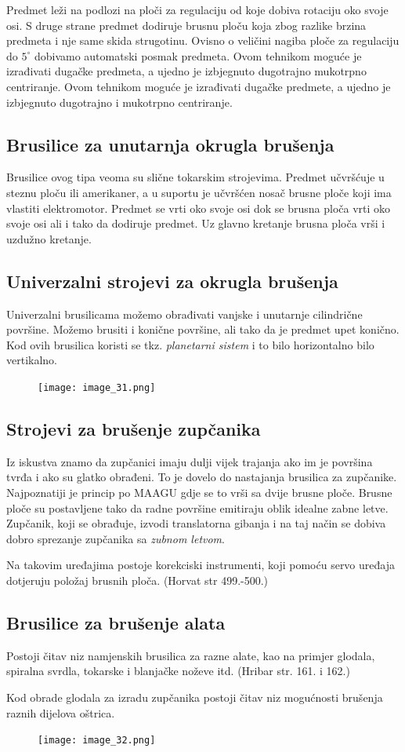 \documentclass[a4paper,12pt]{article}
\numberwithin{figure}{section}
\begin{document}
\FloatBarrier
Predmet leži na podlozi na ploči za regulaciju od koje dobiva rotaciju oko svoje osi. S druge strane predmet dodiruje brusnu ploču koja zbog razlike brzina predmeta i nje same skida strugotinu. Ovisno o veličini nagiba ploče za regulaciju do $5^{\circ}$ dobivamo automatski posmak predmeta. Ovom tehnikom moguće je izrađivati dugačke predmeta, a ujedno je izbjegnuto dugotrajno mukotrpno centriranje. Ovom tehnikom moguće je izrađivati dugačke predmete, a ujedno je izbjegnuto dugotrajno i mukotrpno centriranje. 
\subsection{Brusilice za unutarnja okrugla brušenja}
Brusilice ovog tipa veoma su slične tokarskim strojevima. Predmet učvršćuje u steznu ploču ili amerikaner, a u suportu je učvršćen nosač brusne ploče koji ima vlastiti elektromotor. Predmet se vrti oko svoje osi dok se brusna ploča vrti oko svoje osi ali i tako da dodiruje predmet. Uz glavno kretanje brusna ploča vrši i uzdužno kretanje.
\subsection{Univerzalni strojevi za okrugla brušenja}
Univerzalni brusilicama možemo obrađivati vanjske i unutarnje cilindrične površine. Možemo brusiti i konične površine, ali tako da je predmet upet konično. Kod ovih brusilica koristi se tkz. \textit{planetarni sistem} i to bilo horizontalno bilo vertikalno.
\begin{figure}[!h]
\centering
\texttt{[image: image\_31.png]}
\end{figure}
\FloatBarrier
\subsection{Strojevi za brušenje zupčanika}
Iz iskustva znamo da zupčanici imaju dulji vijek trajanja ako im je površina tvrđa i ako su glatko obrađeni. To je dovelo do nastajanja brusilica za zupčanike. Najpoznatiji je princip po MAAGU gdje se to vrši sa dvije brusne ploče. Brusne ploče su postavljene tako da radne površine emitiraju oblik idealne zabne letve. Zupčanik, koji se obrađuje, izvodi translatorna gibanja i na taj način se dobiva dobro sprezanje zupčanika sa \textit{zubnom letvom}. \par 
Na takovim uređajima postoje korekciski instrumenti, koji pomoću servo uređaja dotjeruju položaj brusnih ploča. (Horvat str 499.-500.)
\subsection{Brusilice za brušenje alata}
Postoji čitav niz namjenskih brusilica za razne alate, kao na primjer  glodala, spiralna svrdla, tokarske i blanjačke noževe itd. (Hribar str. 161. i 162.)\par
Kod obrade glodala za izradu zupčanika postoji čitav niz mogućnosti brušenja raznih dijelova oštrica.
\begin{figure}[!h]
\centering
\texttt{[image: image\_32.png]}
\end{figure}
\FloatBarrier
\end{document}
